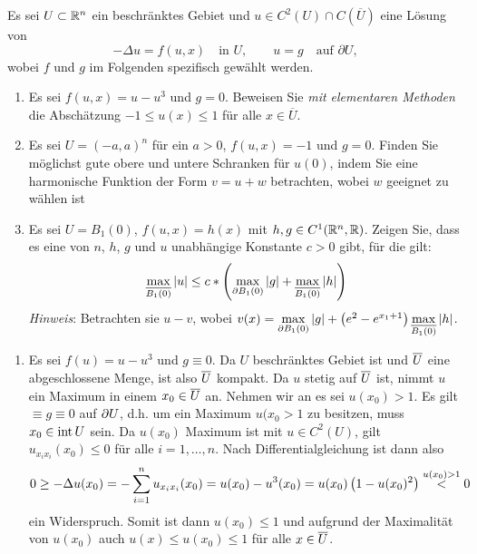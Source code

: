 \begin{exercisePage}
	\begin{task}
		Es sei $U \subset \mathbb{R}^n$ ein beschränktes Gebiet und $u \in C^2(U)\cap C(\overline U)$ eine Lösung von
		$$-\Delta u = f(u,x)\quad\text{in }U,\qquad u = g \quad\text{auf }\partial U,$$
		wobei $f$ und $g$ im Folgenden spezifisch gewählt werden.
		\begin{enumerate}
			\item Es sei $f(u,x) = u-u^3$ und $g=0$. Beweisen Sie \emph{mit elementaren Methoden} die Abschätzung $-1\leq u(x)\leq 1$ für alle $x\in \overline{U}$.
			
			\item Es sei $U = (-a,a)^n$ für ein $a>0$, $f(u,x) = -1$ und $g=0$. Finden Sie möglichst gute obere und untere Schranken für $u(0)$, indem Sie eine harmonische Funktion der Form $v=u+w$ betrachten, wobei $w$ geeignet zu wählen ist
			
			\item Es sei $U = B_1(0)$, $f(u,x) = h(x)$ mit $h,g \in C^1(\mathbb{R}^n,\mathbb{R})$. Zeigen Sie, dass es eine von $n$, $h$, $g$ und $u$ unabhängige Konstante $c>0$ gibt, für die gilt:
			\begin{equation*}
				\max_{\overline{B_1(0)}} |u| \leq c * \left( \max_{\partial B_1(0)} |g| +\max_{\overline{B_1(0)}} |h| \right)
			\end{equation*}		
			\emph{Hinweis}: Betrachten sie $u-v$, wobei
			$v(x)=\max\limits_{\partial B_1(0)} |g| + \left(e^2 - e^{x_1+1} \right) \max\limits_{\overline{B_1(0)}} |h|$.
		\end{enumerate}
	\end{task}

	\begin{enumerate}[label=(zu \alph*), leftmargin=*]
		\item Es sei $f(u) = u - u^3$ und $g \equiv 0$. Da $U$ beschränktes Gebiet ist und $\overline{U}$ eine abgeschlossene Menge, ist also $\overline{U}$ kompakt. Da $u$ stetig auf $\overline{U}$ ist, nimmt $u$ ein Maximum in einem $x_0 \in \overline{U}$ an. Nehmen wir an es sei $u(x_0) > 1$. Es gilt $ \equiv g \equiv 0$ auf $\partial U$, d.h. um ein Maximum $u(x_0 > 1$ zu besitzen, muss $x_0 \in \operatorname{int} U$ sein. Da $u(x_0)$ Maximum ist mit $u \in C^2(U)$, gilt $u_{x_i x_i}(x_0) \le 0$ für alle $i=1, \dots, n$. Nach Differentialgleichung ist dann also
		\begin{equation*}
			0 \ge - \Delta u(x_0) =  - \sum_{i=1}^n u_{x_i x_i} (x_0) = u(x_0) - u^3(x_0) = u(x_0) \left( 1 - u(x_0)^2 \right) \overset{u(x_0) > 1}{<} 0
		\end{equation*}
		ein Widerspruch. Somit ist dann $u(x_0) \le 1$ und aufgrund der Maximalität von $u(x_0)$ auch $u(x) \le u(x_0) \le 1$ für alle $x \in \overline{U}$.
		

\end{enumerate}
\end{exercisePage}
